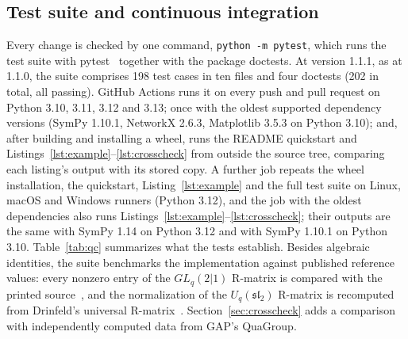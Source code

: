 \documentclass{SciPost}
\newcommand{\code}[1]{\texttt{\begingroup\def\_{\textunderscore\allowbreak}#1\endgroup}}
\newcommand{\Uq}{U_q(\mathfrak{sl}_2)}
\newcommand{\GL}{GL_q(2|1)}
\begin{document}
\subsection{Test suite and continuous integration}

Every change is checked by one command, \code{python -m pytest}, which runs the test suite with pytest~\cite{pytest} together with the package doctests. At version 1.1.1, as at 1.1.0, the suite comprises 198 test cases in ten files and four doctests (202 in total, all passing). GitHub Actions runs it on every push and pull request on Python 3.10, 3.11, 3.12 and 3.13; once with the oldest supported dependency versions (SymPy 1.10.1, NetworkX 2.6.3, Matplotlib 3.5.3 on Python 3.10); and, after building and installing a wheel, runs the README quickstart and Listings~\ref{lst:example}--\ref{lst:crosscheck} from outside the source tree, comparing each listing's output with its stored copy. A further job repeats the wheel installation, the quickstart, Listing~\ref{lst:example} and the full test suite on Linux, macOS and Windows runners (Python 3.12), and the job with the oldest dependencies also runs Listings~\ref{lst:example}--\ref{lst:crosscheck}; their outputs are the same with SymPy 1.14 on Python 3.12 and with SymPy 1.10.1 on Python 3.10. Table~\ref{tab:qc} summarizes what the tests establish. Besides algebraic identities, the suite benchmarks the implementation against published reference values: every nonzero entry of the $\GL$ R-matrix is compared with the printed source~\cite{celik2021}, and the normalization of the $\Uq$ R-matrix is recomputed from Drinfeld's universal R-matrix~\cite{drinfeld1987}. Section~\ref{sec:crosscheck} adds a comparison with independently computed data from GAP's QuaGroup.
\end{document}
